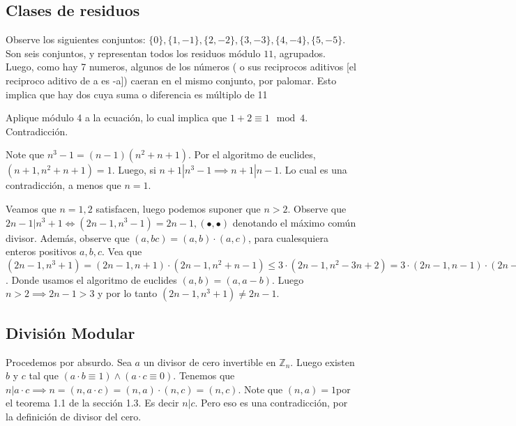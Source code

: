 \subsection{Clases de residuos}

\begin{sol}
	Observe los siguientes conjuntos: $\{0\}, \{1, -1\}, \{2, -2\}, \{3, -3\}, \{4, -4\}, \{5, -5\}$. Son seis conjuntos, y representan todos los residuos m\'odulo $11$, agrupados. Luego, como hay 7 numeros, algunos de los n\'umeros ( o sus reciprocos aditivos [el reciproco aditivo de a es -a])  caeran en el mismo conjunto, por palomar. Esto implica que hay dos cuya suma o diferencia es m\'ultiplo de 11
\end{sol}


\begin{sol}
	Aplique m\'odulo 4 a la ecuaci\'on, lo cual implica que $1 + 2 \equiv 1 \mod 4$. Contradicci\'on.
\end{sol}

\begin{sol}
	Note que $n^3-1 = (n-1)(n^2+n+1)$. Por el algoritmo de euclides, $(n+1, n^2+n+1) = 1$. Luego, si $n+1 | n^3-1 \implies n+1|n-1$. Lo cual es una contradicci\'on, a menos que $n = 1$.
\end{sol}

\begin{sol}
	Veamos que $n = 1, 2$ satisfacen, luego podemos suponer que  $n> 2$. Observe que $2n-1| n^3+1 \iff (2n-1, n^3-1) = 2n-1, (\bullet, \bullet)$ denotando el m\'aximo com\'un divisor. Adem\'as, observe que $(a,bc) = (a,b)\cdot (a,c)$, para cualesquiera enteros positivos $a, b, c$. Vea que $(2n-1, n^3+1) = (2n-1, n+1)\cdot (2n-1, n^2+n-1) \leq 3\cdot (2n-1, n^2-3n+2) = 3\cdot (2n-1, n-1)\cdot(2n-1, n-2) = 3$. Donde usamos el algoritmo de euclides $(a,b) = (a,a-b)$. Luego $n>2 \implies 2n-1 > 3$ y por lo tanto $ (2n-1, n^3+1) \neq 2n-1$. 
\end{sol}


\subsection{Divisi\'on Modular}
\begin{sol}
	Procedemos por absurdo. Sea $a$ un divisor de cero invertible en $\mathbb{Z}_{n}$. Luego existen $b$ y $c$ tal que $(a\cdot b \equiv 1) \land (a\cdot c \equiv 0)$. Tenemos que $n|a\cdot c \implies n = (n, a\cdot c) = (n,a)\cdot (n,c) = (n,c)$. Note que $(n,a) = 1 $por el teorema 1.1 de la secci\'on 1.3. Es decir $n|c$. Pero eso es una contradicci\'on, por la definici\'on de divisor del cero.
\end{sol}

